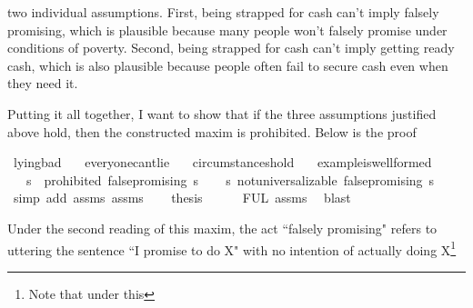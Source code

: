 \begin{isabellebody}
{two individual assumptions. First, being strapped for cash can't imply falsely promising, which is plausible
because many people won't falsely promise under conditions of poverty. Second, being strapped for cash
can't imply getting ready cash, which is also plausible because people often fail to secure cash even 
when they need it.%
}%
\begin{isamarkuptext}%
Putting it all together, I want to show that if the three assumptions justified above hold, then 
the constructed maxim is prohibited. Below is the proof%
\end{isamarkuptext}\isamarkuptrue%
\isamarkupfalse%
\ lying{\isacharunderscore}bad{\isacharunderscore}{}{\isacharcolon}\isanewline
\ \ \ everyone{\isacharunderscore}can{\isacharprime}t{\isacharunderscore}lie\isanewline
\ \ \ circumstances{\isacharunderscore}hold\isanewline
\ \ \ example{\isacharunderscore}is{\isacharunderscore}well{\isacharunderscore}formed\isanewline
\ \ \ {\isachardoublequoteopen}{\isasymforall}s{\isachardot}\ {\isasymTurnstile}\ {\isacharparenleft}prohibited\ false{\isacharunderscore}promising\ s{\isacharparenright}{\isachardoublequoteclose}\isanewline
%
\isadelimproof
%
\endisadelimproof
%
\isatagproof
{}\isamarkupfalse%
{\isacharminus}\isanewline
\ \ \isamarkupfalse%
\ {\isachardoublequoteopen}{\isasymforall}s{\isachardot}\ not{\isacharunderscore}universalizable\ false{\isacharunderscore}promising\ s{\isachardoublequoteclose}\isanewline
\ \ \ \ \isamarkupfalse%
\ {\isacharparenleft}simp\ add{\isacharcolon}\ assms{\isacharparenleft}{}{\isacharparenright}\ assms{\isacharparenleft}{}{\isacharparenright}{\isacharparenright}\isanewline
%
\isanewline
\ \ \isamarkupfalse%
\ {\isacharquery}thesis\isanewline
\ \ \ \ \isamarkupfalse%
\ FUL\ assms{\isacharparenleft}{}{\isacharparenright}\ \isamarkupfalse%
\ blast\ \isanewline
{}\isamarkupfalse%
%
\endisatagproof
{\isafoldproof}%
%
\isadelimproof
%
\endisadelimproof
%
\begin{isamarkuptext}%
Under the second reading of this maxim, the act ``falsely promising" refers to uttering the 
sentence ``I promise to do X" with no intention of actually doing X\footnote{Note that under this 
}
\end{isamarkuptext}
\end{isabellebody}
